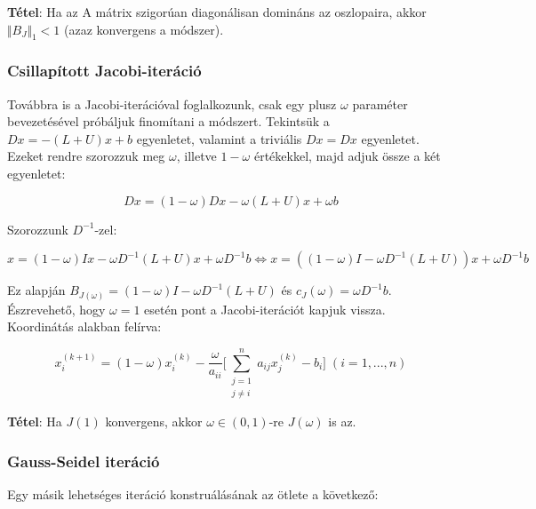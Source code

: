 \documentclass[margin=0px]{article}
\begin{document}
	\noindent \textbf{Tétel}: Ha az A mátrix szigorúan diagonálisan domináns az oszlopaira, akkor
	$\Vert B_{J} \Vert_{1} < 1$ (azaz konvergens a módszer).
	
	\subsubsection{Csillapított Jacobi-iteráció}
	
	Továbbra is a Jacobi-iterációval foglalkozunk, csak egy plusz $\omega$ paraméter bevezetésével próbáljuk
	finomítani a módszert. Tekintsük a  $Dx = -(L + U)x + b$ egyenletet, valamint a triviális $Dx =
	Dx$ egyenletet. Ezeket rendre szorozzuk meg $\omega$, illetve $1 - \omega$ értékekkel, majd adjuk össze a két
	egyenletet:
	
	\begin{displaymath}
	Dx = (1 - \omega)Dx -\omega(L+U)x + \omega b
	\end{displaymath}
	
	\noindent Szorozzunk $D^{-1}$-zel:
	
	\begin{displaymath}
	x = (1 - \omega)Ix -\omega D^{-1}(L+U)x + \omega D^{-1}b \Longleftrightarrow
	x = ((1 - \omega)I -\omega D^{-1}(L+U))x + \omega D^{-1}b	
	\end{displaymath}
	
	\noindent Ez alapján $B_{J(\omega)} = (1 - \omega)I -\omega D^{-1}(L+U)$ és $c_{J}(\omega) = \omega D^{-1}b$.\\
	
	\noindent Észrevehető, hogy $\omega = 1$ esetén pont a Jacobi-iterációt kapjuk vissza.\\
	
	\noindent Koordinátás alakban felírva:
	
	\begin{displaymath}
	x^{(k+1)}_{i} =
	(1 - \omega)x^{(k)}_{i}
	-\frac{\omega}{a_{ii}}
	\Bigg[
	\sum_{\substack{j=1\\ j \not = i}}^{n} a_{ij}x_{j}^{(k)} - b_{i}
	\Bigg]
	\; (i = 1, ..., n)
	\end{displaymath}
	
	\noindent \textbf{Tétel}: Ha $J(1)$ konvergens, akkor $\omega \in (0,1)$-re $J(\omega)$ is az.
	
	\subsubsection{Gauss-Seidel iteráció}
	
	\noindent Egy másik lehetséges iteráció konstruálásának az ötlete a következő:
	
\end{document}
